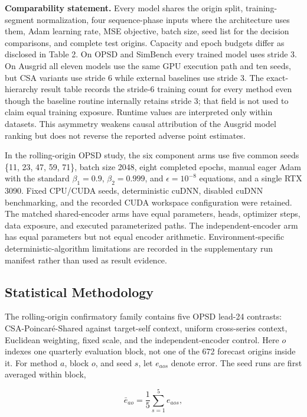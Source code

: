 \documentclass[electronics,article,submit,moreauthors]{Definitions/mdpi}
\begin{document}
\textbf{Comparability statement.} Every model shares the origin split, training-segment normalization, four sequence-phase inputs where the architecture uses them, Adam learning rate, MSE objective, batch size, seed list for the decision comparisons, and complete test origins. Capacity and epoch budgets differ as disclosed in Table 2. On OPSD and SimBench every trained model uses stride 3. On Ausgrid all eleven models use the same GPU execution path and ten seeds, but CSA variants use stride 6 while external baselines use stride 3. The exact-hierarchy result table records the stride-6 training count for every method even though the baseline routine internally retains stride 3; that field is not used to claim equal training exposure. Runtime values are interpreted only within datasets. This asymmetry weakens causal attribution of the Ausgrid model ranking but does not reverse the reported adverse point estimates.

In the rolling-origin OPSD study, the six component arms use five common seeds \{11, 23, 47, 59, 71\}, batch size 2048, eight completed epochs, manual eager Adam with the standard \(\beta_1=0.9\), \(\beta_2=0.999\), and \(\epsilon=10^{-8}\) equations, and a single RTX 3090. Fixed CPU/CUDA seeds, deterministic cuDNN, disabled cuDNN benchmarking, and the recorded CUDA workspace configuration were retained. The matched shared-encoder arms have equal parameters, heads, optimizer steps, data exposure, and executed parameterized paths. The independent-encoder arm has equal parameters but not equal encoder arithmetic. Environment-specific deterministic-algorithm limitations are recorded in the supplementary run manifest rather than used as result evidence.

\subsection{Statistical Methodology}\label{statistical-methodology}

The rolling-origin confirmatory family contains five OPSD lead-24 contrasts: CSA-Poincar\'{e}-Shared against target-self context, uniform cross-series context, Euclidean weighting, fixed scale, and the independent-encoder control. Here \(o\) indexes one quarterly evaluation block, not one of the 672 forecast origins inside it. For method \(a\), block \(o\), and seed \(s\), let \(e_{aos}\) denote error. The seed runs are first averaged within block,

\[
\bar e_{ao}=\frac{1}{5}\sum_{s=1}^{5}e_{aos},
\]
\end{document}
